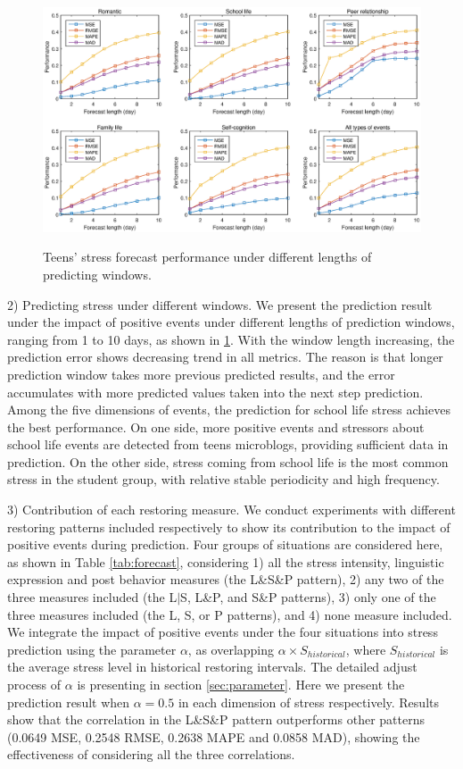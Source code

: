 \begin{figure}
\centering
\caption{Teens' stress forecast performance under different lengths of predicting windows.}
\includegraphics[width=\linewidth]{figs/predictWindow2.eps}
\label{fig:length}
\end{figure}

2) Predicting stress under different windows.
We present the prediction result under the impact of positive events under different lengths of prediction windows,
ranging from 1 to 10 days, as shown in \ref{fig:length}.
With the window length increasing,
the prediction error shows decreasing trend in all metrics.
The reason is that longer prediction window takes more previous predicted results,
and the error accumulates with more predicted values taken into the next step prediction.
Among the five dimensions of events,
the prediction for school life stress achieves the best performance.
On one side,
more positive events and stressors about school life events are detected from teens microblogs,
providing sufficient data in prediction.
On the other side,
stress coming from school life is the most common stress in the student group,
with relative stable periodicity and high frequency.

3) Contribution of each restoring measure.
We conduct experiments with different restoring patterns included respectively to show
its contribution to the impact of positive events during prediction.
Four groups of situations are considered here, as shown in Table \ref{tab:forecast},
considering
1) all the stress intensity, linguistic expression and post behavior measures (the L\&S\&P pattern),
2) any two of the three measures included (the L$|$S, L\&P, and S\&P patterns),
3) only one of the three measures included (the L, S, or P patterns),
and 4) none measure included.
We integrate the impact of positive events under the four situations into stress prediction
using the parameter $\alpha$,
as overlapping $\alpha \times S_{historical}$,
where $S_{historical}$ is the average stress level in historical restoring intervals.
The detailed adjust process of $\alpha$  is presenting in section \ref{sec:parameter}.
Here we present the prediction result when $\alpha = 0.5$ in each dimension of stress respectively.
Results show that the correlation in the L\&S\&P pattern outperforms other patterns
(0.0649 MSE, 0.2548 RMSE, 0.2638 MAPE and 0.0858 MAD),
showing the effectiveness of considering all the three correlations.

